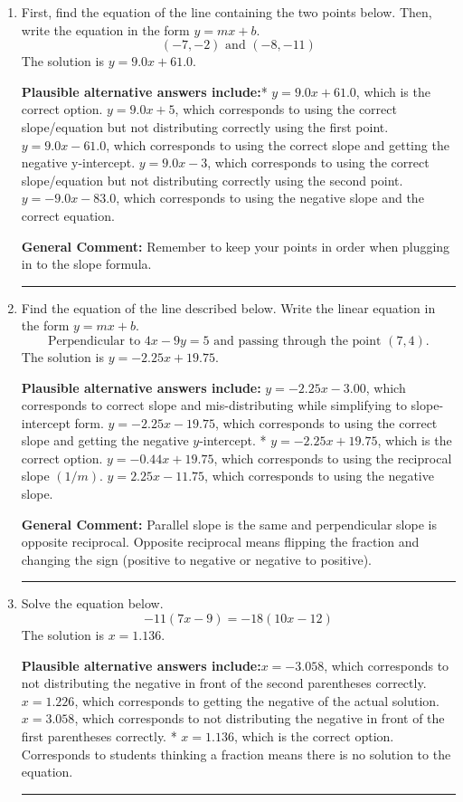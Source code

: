 \documentclass{extbook}[14pt]
\newcommand{\litem}[1]{\item #1

\rule{\textwidth}{0.4pt}}
\begin{document}
\begin{enumerate}\litem{
First, find the equation of the line containing the two points below. Then, write the equation in the form $ y=mx+b $.
\[ (-7, -2) \text{ and } (-8, -11) \]The solution is \( y = 9.0x + 61.0 \).\begin{enumerate}[label=\Alph*.]
\textbf{Plausible alternative answers include:}* $y = 9.0x + 61.0$, which is the correct option.
 $y = 9.0x + 5$, which corresponds to using the correct slope/equation but not distributing correctly using the first point.
 $y = 9.0x -61.0$, which corresponds to using the correct slope and getting the negative y-intercept.
 $y = 9.0x -3$, which corresponds to using the correct slope/equation but not distributing correctly using the second point.
 $y = -9.0x -83.0$, which corresponds to using the negative slope and the correct equation.
\end{enumerate}

\textbf{General Comment:} Remember to keep your points in order when plugging in to the slope formula.
}
\litem{
Find the equation of the line described below. Write the linear equation in the form $y=mx+b$.
\[ \text{Perpendicular to } 4 x - 9 y = 5 \text{ and passing through the point } (7, 4). \]The solution is \( y = -2.25x + 19.75 \).\begin{enumerate}[label=\Alph*.]
\textbf{Plausible alternative answers include:} $y = -2.25x - 3.00$, which corresponds to correct slope and mis-distributing while simplifying to slope-intercept form.
 $y = -2.25x - 19.75$, which corresponds to using the correct slope and getting the negative $y$-intercept.
* $y = -2.25x + 19.75$, which is the correct option.
 $y = -0.44x + 19.75$, which corresponds to using the reciprocal slope $(1/m)$.
 $y = 2.25x - 11.75$, which corresponds to using the negative slope.
\end{enumerate}

\textbf{General Comment:} Parallel slope is the same and perpendicular slope is opposite reciprocal. Opposite reciprocal means flipping the fraction and changing the sign (positive to negative or negative to positive).
}
\litem{
Solve the equation below.
\[ -11(7x -9) = -18(10x -12) \]The solution is \( x = 1.136 \).\begin{enumerate}[label=\Alph*.]
\textbf{Plausible alternative answers include:}$x = -3.058$, which corresponds to not distributing the negative in front of the second parentheses correctly.
$x = 1.226$, which corresponds to getting the negative of the actual solution.
$x = 3.058$, which corresponds to not distributing the negative in front of the first parentheses correctly.
* $x = 1.136$, which is the correct option.
Corresponds to students thinking a fraction means there is no solution to the equation.
\end{enumerate}

}
\end{enumerate}
\end{document}
